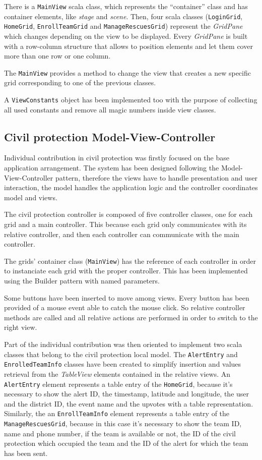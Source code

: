 \documentclass[a4paper,12pt]{report}
\begin{document}
There is a \texttt{MainView} scala class, which represents the ``container'' class and has container elements, like \textit{stage} and \textit{scene}.
Then, four scala classes (\texttt{LoginGrid}, \texttt{HomeGrid}, \texttt{EnrollTeamGrid} and \texttt{ManageRescuesGrid}) represent the \textit{GridPane} which changes depending on the view to be displayed.
Every \textit{GridPane} is built with a row-column structure that allows to position elements and let them cover more than one row or one column.

The \texttt{MainView} provides a method to change the view that creates a new specific grid corresponding to one of the previous classes.

A \texttt{ViewConstants} object has been implemented too with the purpose of collecting all used constants and remove all magic numbers inside view classes.

\subsection{Civil protection Model-View-Controller}
Individual contribution in civil protection was firstly focused on the base application arrangement. The system has been designed following the Model-View-Controller pattern, therefore the views have to handle presentation and user interaction, the model handles the application logic and the controller coordinates model and views.

The civil protection controller is composed of five controller classes, one for each grid and a main controller. This because each grid only communicates with its relative controller, and then each controller can communicate with the main controller.

The grids' container class (\texttt{MainView}) has the reference of each controller in order to instanciate each grid with the proper controller. This has been implemented using the Builder pattern with named parameters.

Some buttons have been inserted to move among views. Every button has been provided of a mouse event able to catch the mouse click. So relative controller methods are called and all relative actions are performed in order to switch to the right view.

Part of the individual contribution was then oriented to implement two scala classes that belong to the civil protection local model.
The \texttt{AlertEntry} and \texttt{EnrolledTeamInfo} classes have been created to simplify insertion and values retrieval from the \textit{TableView} elements contained in the relative views. An \texttt{AlertEntry} element represents a table entry of the \texttt{HomeGrid}, because it's necessary to show the alert ID, the timestamp, latitude and longitude, the user and the district ID, the event name and the upvotes with a table representation. Similarly, the an \texttt{EnrollTeamInfo} element represents a table entry of the \texttt{ManageRescuesGrid}, because in this case it's necessary to show the team ID, name and phone number, if the team is available or not, the ID of the civil protection which occupied the team and the ID of the alert for which the team has been sent.
\end{document}

